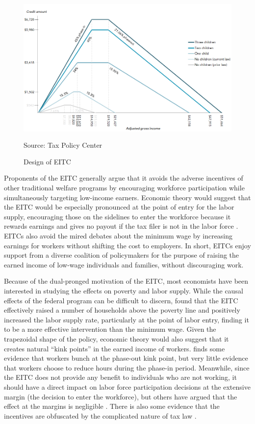 \documentclass{article}
\begin{document}
 \begin{figure}[H]
    \caption{Design of EITC}
    \begin{center}
        \includegraphics[width=.85\textwidth]{eitc_design}
    \end{center}
    \label{fig:tax}{Source: Tax Policy Center}
\end{figure}

Proponents of the EITC generally argue that it avoids the adverse incentives of other traditional welfare programs by encouraging workforce participation while simultaneously targeting low-income earners. Economic theory would suggest that the EITC would be especially pronounced at the point of entry for the labor supply, encouraging those on the sidelines to enter the workforce because it rewards earnings and gives no payout if the tax filer is not in the labor force \citep{eissa2006behavioral}. EITCs also avoid the mired debates about the minimum wage by increasing earnings for workers without shifting the cost to employers. In short, EITCs enjoy support from a diverse coalition of policymakers for the purpose of raising the earned income of low-wage individuals and families, without discouraging work.

Because of the dual-pronged motivation of the EITC, most economists have been interested in studying the effects on poverty and labor supply. While the causal effects of the federal program can be difficult to discern, \cite{neumark2001using} found that the EITC effectively raised a number of households above the poverty line and positively increased the labor supply rate, particularly at the point of labor entry, finding it to be a more effective intervention than the minimum wage. Given the trapezoidal shape of the policy, economic theory would also suggest that it creates natural “kink points” in the earned income of workers.  \cite{saez2010taxpayers} finds some evidence that workers bunch at the phase-out kink point, but very little evidence that workers choose to reduce hours during the phase-in period. Meanwhile, since the EITC does not provide any benefit to individuals who are not working, it should have a direct impact on labor force participation decisions at the extensive margin (the decision to enter the workforce), but others have argued that the effect at the margins is negligible \citep{kleven2019eitc}. There is also some evidence that the incentives are obfuscated by the complicated nature of tax law \citep{chetty2013teaching}.
\end{document}
